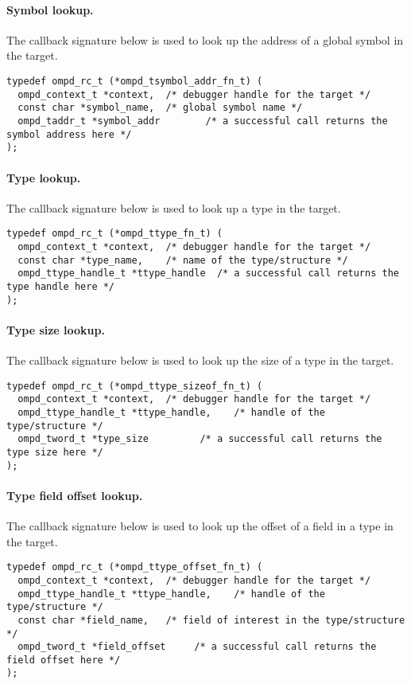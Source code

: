 \documentclass{article}
\begin{document}
\paragraph{Symbol lookup.}
The callback signature below is used to look up the address of a global symbol in the target.
\begin{verbatim}
typedef ompd_rc_t (*ompd_tsymbol_addr_fn_t) (
  ompd_context_t *context,  /* debugger handle for the target */
  const char *symbol_name,  /* global symbol name */
  ompd_taddr_t *symbol_addr        /* a successful call returns the symbol address here */
);
\end{verbatim}

\paragraph{Type lookup.} The callback signature below is used to look up a type in the target.
\begin{verbatim}
typedef ompd_rc_t (*ompd_ttype_fn_t) (
  ompd_context_t *context,  /* debugger handle for the target */
  const char *type_name,    /* name of the type/structure */
  ompd_ttype_handle_t *ttype_handle  /* a successful call returns the type handle here */
);
\end{verbatim}

\paragraph{Type size lookup.} The callback signature below is used to look up the size of a type in the target.
\begin{verbatim}
typedef ompd_rc_t (*ompd_ttype_sizeof_fn_t) (
  ompd_context_t *context,  /* debugger handle for the target */
  ompd_ttype_handle_t *ttype_handle,    /* handle of the type/structure */
  ompd_tword_t *type_size         /* a successful call returns the type size here */
);
\end{verbatim}

\paragraph{Type field offset lookup.} The callback signature below is used to look up the offset of a field in a type in the target.
\begin{verbatim}
typedef ompd_rc_t (*ompd_ttype_offset_fn_t) (
  ompd_context_t *context,  /* debugger handle for the target */
  ompd_ttype_handle_t *ttype_handle,    /* handle of the type/structure */
  const char *field_name,   /* field of interest in the type/structure */
  ompd_tword_t *field_offset     /* a successful call returns the field offset here */
);
\end{verbatim}
\end{document}
